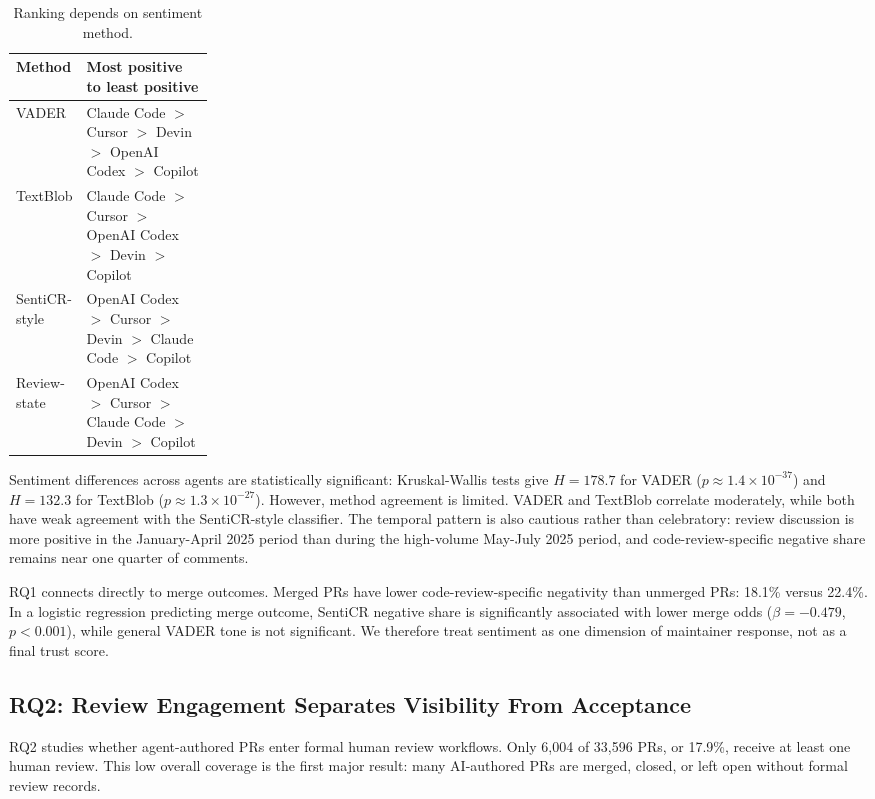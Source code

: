\documentclass[sigconf,nonacm]{acmart}
\begin{document}
\begin{table}[!htbp]
\caption{Ranking depends on sentiment method.}
\label{tab:sentiment-ranking}
\centering
\small
\begin{tabularx}{\linewidth}{>{\raggedright\arraybackslash}p{0.23\linewidth}X}
\toprule
Method & Most positive to least positive \\
\midrule
VADER & Claude Code $>$ Cursor $>$ Devin $>$ OpenAI Codex $>$ Copilot \\
TextBlob & Claude Code $>$ Cursor $>$ OpenAI Codex $>$ Devin $>$ Copilot \\
SentiCR-style & OpenAI Codex $>$ Cursor $>$ Devin $>$ Claude Code $>$ Copilot \\
Review-state & OpenAI Codex $>$ Cursor $>$ Claude Code $>$ Devin $>$ Copilot \\
\bottomrule
\end{tabularx}
\end{table}

Sentiment differences across agents are statistically significant: Kruskal-Wallis tests give $H=178.7$ for VADER ($p \approx 1.4 \times 10^{-37}$) and $H=132.3$ for TextBlob ($p \approx 1.3 \times 10^{-27}$). However, method agreement is limited. VADER and TextBlob correlate moderately, while both have weak agreement with the SentiCR-style classifier. The temporal pattern is also cautious rather than celebratory: review discussion is more positive in the January-April 2025 period than during the high-volume May-July 2025 period, and code-review-specific negative share remains near one quarter of comments.

RQ1 connects directly to merge outcomes. Merged PRs have lower code-review-specific negativity than unmerged PRs: 18.1\% versus 22.4\%. In a logistic regression predicting merge outcome, SentiCR negative share is significantly associated with lower merge odds ($\beta=-0.479$, $p<0.001$), while general VADER tone is not significant. We therefore treat sentiment as one dimension of maintainer response, not as a final trust score.

\FloatBarrier
\subsection{RQ2: Review Engagement Separates Visibility From Acceptance}

RQ2 studies whether agent-authored PRs enter formal human review workflows. Only 6,004 of 33,596 PRs, or 17.9\%, receive at least one human review. This low overall coverage is the first major result: many AI-authored PRs are merged, closed, or left open without formal review records.
\end{document}
